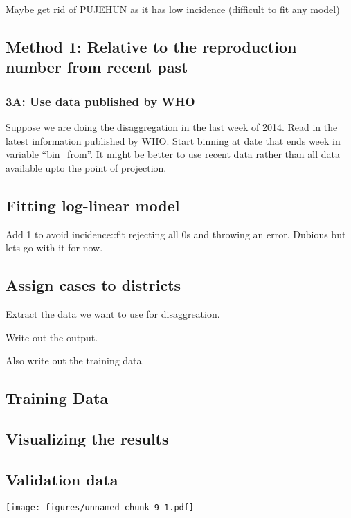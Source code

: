 \documentclass[11pt,]{article}
\begin{document}
Maybe get rid of PUJEHUN as it has low incidence (difficult to fit any
model)

\subsection{Method 1: Relative to the reproduction number from recent
past}\label{method-1-relative-to-the-reproduction-number-from-recent-past}

\subsubsection{3A: Use data published by
WHO}\label{a-use-data-published-by-who}

Suppose we are doing the disaggregation in the last week of 2014. Read
in the latest information published by WHO. Start binning at date that
ends week in variable ``bin\_from''. It might be better to use recent
data rather than all data available upto the point of projection.

\subsection{Fitting log-linear model}\label{fitting-log-linear-model}

Add 1 to avoid incidence::fit rejecting all 0s and throwing an error.
Dubious but lets go with it for now.

\subsection{Assign cases to districts}\label{assign-cases-to-districts}

Extract the data we want to use for disaggreation.

Write out the output.

Also write out the training data.

\subsection{Training Data}\label{training-data}

\subsection{Visualizing the results}\label{visualizing-the-results}

\subsection{Validation data}\label{validation-data-1}

\texttt{[image: figures/unnamed-chunk-9-1.pdf]}
\end{document}
